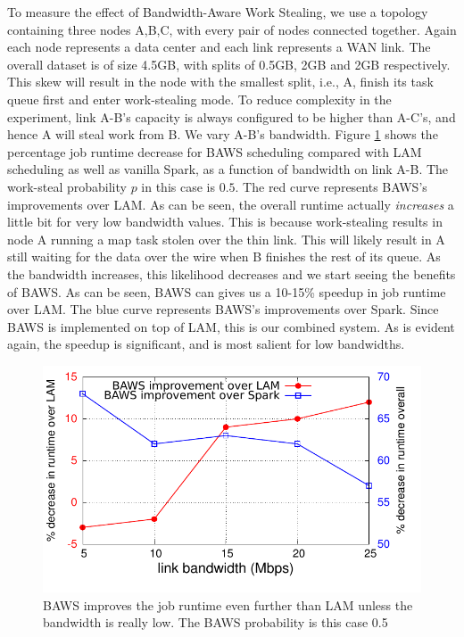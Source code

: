 To measure the effect of Bandwidth-Aware Work Stealing, we use a topology containing three nodes A,B,C, with every pair of nodes connected together. 
Again each node represents a data center and each link represents a WAN link. The overall dataset is of size 4.5GB, with splits of 0.5GB, 2GB and 2GB respectively. This skew will result in the node with the smallest split, i.e., A, finish its task queue first and enter work-stealing mode. To reduce complexity in the experiment, link A-B's capacity is always configured to be higher than A-C's, and hence A will steal work from B. We vary A-B's bandwidth.  
Figure \ref{fig:baws} shows the percentage job runtime decrease for BAWS scheduling compared with LAM scheduling as well as vanilla Spark, 
as a function of bandwidth on link A-B. The work-steal probability $p$ in this case is $0.5$. 
The red curve represents BAWS's improvements over LAM. As can be seen, the overall runtime actually \emph{increases} a little bit for very low bandwidth values.
This is because work-stealing results in node A running a map task stolen over the thin link. This will likely result in A still waiting for the data over the wire when B finishes the rest of its queue. As the bandwidth increases, this likelihood decreases and we start seeing the benefits of BAWS.
As can be seen, BAWS can gives us a 10-15\% speedup in job runtime over LAM. The blue curve represents BAWS's improvements over
Spark. Since BAWS is implemented on top of LAM, this is our combined system. As is evident again, the speedup is significant, and is most salient
for low bandwidths.


\begin{figure}[!ht]
\centering\includegraphics[width=\columnwidth]{figs/baws.pdf}
\vspace{-1.2em}
\caption{BAWS improves the job runtime even further than LAM unless the bandwidth is really low. The BAWS probability is this case 0.5}
\label{fig:baws}
\vspace{.7em}
\end{figure}

